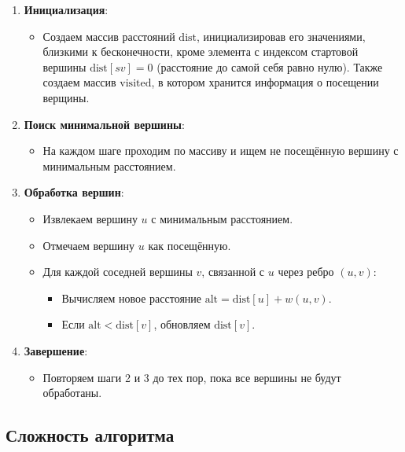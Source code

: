\documentclass[12pt]{article}
\begin{document}
\begin{enumerate}
    \item \textbf{Инициализация}:
    \begin{itemize}
        \item Создаем массив расстояний \( \text{dist} \), инициализировав его значениями, близкими к бесконечности, кроме элемента с индексом стартовой вершины \( \text{dist}[sv] = 0 \) (расстояние до самой себя равно нулю). Также создаем массив \( \text{visited} \), в котором хранится информация о посещении верщины. 
    \end{itemize}
    
    \item \textbf{Поиск минимальной вершины}:
    \begin{itemize}
        \item На каждом шаге проходим по массиву и ищем не посещённую вершину с минимальным расстоянием.
    \end{itemize}

    \item \textbf{Обработка вершин}:
    \begin{itemize}
        \item Извлекаем вершину \( u \) с минимальным расстоянием.
         \item Отмечаем вершину \( u \) как посещённую.
        \item Для каждой соседней вершины \( v \), связанной с \( u \) через ребро \( (u, v) \):
        \begin{itemize}
            \item Вычисляем новое расстояние \( \text{alt} = \text{dist}[u] + w(u, v) \).
            \item Если \( \text{alt} < \text{dist}[v] \), обновляем \( \text{dist}[v] \).
        \end{itemize}
         
    \end{itemize}
    
    \item \textbf{Завершение}:
    \begin{itemize}
        \item Повторяем шаги 2 и 3 до тех пор, пока все вершины не будут обработаны.
    \end{itemize}
\end{enumerate}

\subsection*{Сложность алгоритма}
\end{document}
